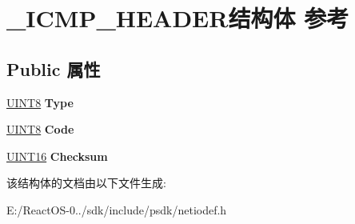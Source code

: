 \hypertarget{struct___i_c_m_p___h_e_a_d_e_r}{}\section{\+\_\+\+I\+C\+M\+P\+\_\+\+H\+E\+A\+D\+E\+R结构体 参考}
\label{struct___i_c_m_p___h_e_a_d_e_r}
\subsection*{Public 属性}
\begin{DoxyCompactItemize}
\item 
\mbox{\label{struct___i_c_m_p___h_e_a_d_e_r_ade631e1ac8266c464e07c5f88b8e373d}} 
\hyperlink{_processor_bind_8h_ab27e9918b538ce9d8ca692479b375b6a}{U\+I\+N\+T8} {\bfseries Type}
\item 
\mbox{\label{struct___i_c_m_p___h_e_a_d_e_r_a1a67178a2d0b6e7caf01bf2a2ea13b95}} 
\hyperlink{_processor_bind_8h_ab27e9918b538ce9d8ca692479b375b6a}{U\+I\+N\+T8} {\bfseries Code}
\item 
\mbox{\label{struct___i_c_m_p___h_e_a_d_e_r_a1516aa5757e731ce4dff17552eddd8cd}} 
\hyperlink{_processor_bind_8h_a09f1a1fb2293e33483cc8d44aefb1eb1}{U\+I\+N\+T16} {\bfseries Checksum}
\end{DoxyCompactItemize}


该结构体的文档由以下文件生成\+:\begin{DoxyCompactItemize}
\item 
E\+:/\+React\+O\+S-\/0../sdk/include/psdk/netiodef.\+h\end{DoxyCompactItemize}
